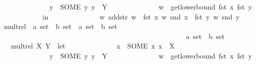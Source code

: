 \documentclass[12pt]{scrartcl}
\begin{document}
\begin{isabelle}
\ \ \ \ \ \ \ \ \ \ \ \ \ \ y\ {\isacharequal}{\kern0pt}\ {\isacharparenleft}{\kern0pt}SOME\ y{\isachardot}{\kern0pt}\ y\ {\isasymin}\ Y{\isacharparenright}{\kern0pt}{\isacharsemicolon}{\kern0pt}\isanewline
\ \ \ \ \ \ \ \ \ \ \ \ \ \ w\ {\isacharequal}{\kern0pt}\ get{\isacharunderscore}{\kern0pt}lower{\isacharunderscore}{\kern0pt}bound\ {\isacharparenleft}{\kern0pt}fst\ x{\isacharparenright}{\kern0pt}\ {\isacharparenleft}{\kern0pt}fst\ y{\isacharparenright}{\kern0pt}\isanewline
\ \ \ \ \ \ \ \ \ \ \ \ in\isanewline
\ \ \ \ \ \ \ \ \ \ \ \ \ \ {\isasymlfloor}w{\isacharcomma}{\kern0pt}\ add{\isacharunderscore}{\kern0pt}str\ w\ {\isacharparenleft}{\kern0pt}{\isasymrho}\ {\isacharparenleft}{\kern0pt}fst\ x{\isacharparenright}{\kern0pt}\ w\ {\isacharparenleft}{\kern0pt}snd\ x{\isacharparenright}{\kern0pt}{\isacharparenright}{\kern0pt}\ {\isacharparenleft}{\kern0pt}{\isasymrho}\ {\isacharparenleft}{\kern0pt}fst\ y{\isacharparenright}{\kern0pt}\ w\ {\isacharparenleft}{\kern0pt}snd\ y{\isacharparenright}{\kern0pt}{\isacharparenright}{\kern0pt}{\isasymrfloor}{\isachardoublequoteclose}\isanewline
\isanewline
{}\isamarkupfalse%
\ mult{\isacharunderscore}{\kern0pt}rel\ {\isacharcolon}{\kern0pt}{\isacharcolon}{\kern0pt}\ {\isachardoublequoteopen}{\isacharparenleft}{\kern0pt}{\isacharprime}{\kern0pt}a\ set\ {\isasymtimes}\ {\isacharprime}{\kern0pt}b{\isacharparenright}{\kern0pt}\ set\ {\isasymRightarrow}\ {\isacharparenleft}{\kern0pt}{\isacharprime}{\kern0pt}a\ set\ {\isasymtimes}\ {\isacharprime}{\kern0pt}b{\isacharparenright}{\kern0pt}\ set\ \isanewline
\ \ \ \ \ \ \ \ \ \ \ \ \ \ \ \ \ \ \ \ \ \ \ \ \ \ \ \ \ \ \ \ \ \ \ \ \ \ \ \ \ \ \ \ \ \ \ \ \ \ \ \ {\isasymRightarrow}\ {\isacharparenleft}{\kern0pt}{\isacharprime}{\kern0pt}a\ set\ {\isasymtimes}\ {\isacharprime}{\kern0pt}b{\isacharparenright}{\kern0pt}\ set{\isachardoublequoteclose}\isanewline
\ \ \ {\isachardoublequoteopen}mult{\isacharunderscore}{\kern0pt}rel\ X\ Y\ {\isasymequiv}\ let\isanewline
\ \ \ \ \ \ \ \ \ \ \ \ \ \ x\ {\isacharequal}{\kern0pt}\ {\isacharparenleft}{\kern0pt}SOME\ x{\isachardot}{\kern0pt}\ x\ {\isasymin}\ X{\isacharparenright}{\kern0pt}{\isacharsemicolon}{\kern0pt}\isanewline
\ \ \ \ \ \ \ \ \ \ \ \ \ \ y\ {\isacharequal}{\kern0pt}\ {\isacharparenleft}{\kern0pt}SOME\ y{\isachardot}{\kern0pt}\ y\ {\isasymin}\ Y{\isacharparenright}{\kern0pt}{\isacharsemicolon}{\kern0pt}\isanewline
\ \ \ \ \ \ \ \ \ \ \ \ \ \ w\ {\isacharequal}{\kern0pt}\ get{\isacharunderscore}{\kern0pt}lower{\isacharunderscore}{\kern0pt}bound\ {\isacharparenleft}{\kern0pt}fst\ x{\isacharparenright}{\kern0pt}\ {\isacharparenleft}{\kern0pt}fst\ y{\isacharparenright}{\kern0pt}\isanewline

\end{isabelle}
\end{document}
